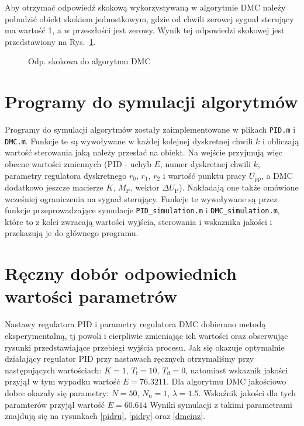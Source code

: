 Aby otrzymać odpowiedź skokową wykorzystywaną w algorytmie DMC należy pobudzić obiekt skokiem jednostkowym, gdzie od chwili zerowej sygnał sterujący ma wartość 1, a w przeszłości jest zerowy. Wynik tej odpowiedzi skokowej jest przedstawiony na Rys.~\ref{skok1}.

\begin{figure}

\centering
\caption{Odp. skokowa do algorytmu DMC}

\label{skok1}
\end{figure}

\section{Programy do symulacji algorytmów}
Programy do symulacji algorytmów zostały zaimplementowane w plikach \texttt{PID.m} i \texttt{DMC.m}. Funkcje te są wywoływane w każdej kolejnej dyskretnej chwili $k$ i obliczają wartość sterowania jaką należy przesłać na obiekt. Na wejście przyjmują więc obecne wartości zmiennych (PID - uchyb $E$, numer dyskretnej chwili $k$, parametry regulatora dyskretnego $r_{\mathrm{0}}$, $r_{\mathrm{1}}$, $r_{\mathrm{2}}$ i wartość punktu pracy $U_{\mathrm{pp}}$, a DMC dodatkowo jeszcze macierze $K$, $M_{\mathrm{P}}$, wektor $\Delta U_{\mathrm{P}}$). Nakładają one także omówione wcześniej ograniczenia na sygnał sterujący. Funkcje te wywoływane są przez funkcje przeprowadzające symulacje \texttt{PID\_simulation.m} i \texttt{DMC\_simulation.m}, które to z kolei zwracają wartości wyjścia, sterowania i wskaznika jakości i przekazują je do głównego programu.

\section{Ręczny dobór odpowiednich wartości parametrów}
Nastawy regulatora PID i parametry regulatora DMC dobierano metodą eksperymentalną, tj powoli i cierpliwie zmieniając ich wartości oraz obserwując rysunki przedstawiające przebiegi wyjścia procesu. Jak się okazuje optymalnie działający regulator PID przy nastawach ręcznych otrzymaliśmy przy następujących wartościach: $K=\num{1}$, $T_\mathrm{i}=10$, $T_\mathrm{d}=0$, natomiast wskaznik jakości przyjął w tym wypadku wartość $E=\num{76.3211}$. Dla algorytmu DMC jakościowo dobre okazały się parametry: $N=50$, $N_\mathrm{u}=1$, $\lambda=\num{1.5}$. Wskaźnik jakości dla tych paramterów przyjął wartość $E=\num{60.614}$  Wyniki symulacji z takimi parametrami znajdują się na rysunkach \ref{pidru}, \ref{pidry} oraz \ref{dmcinz}.

